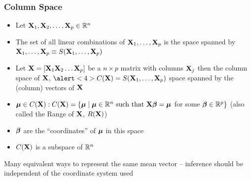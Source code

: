 \documentclass[handout]{beamer}
\begin{document}
\begin{frame}
  \frametitle{Column Space}
\begin{itemize}
\item Let $\mathbf{X}_1, \mathbf{X}_2,\ldots, \mathbf{X}_p \in \mathbb{R}^n$  \pause
\item The set of all linear combinations of $\mathbf{X}_1, \ldots, \mathbf{X}_p$ is
  the space spanned by $\mathbf{X}_1, \ldots, \mathbf{X}_p \equiv S(\mathbf{X}_1, \ldots,
  \mathbf{X}_p)$  \pause
\item Let $\mathbf{X} = [ \mathbf{X}_1\mathbf{X}_2 \ldots \mathbf{X}_p]$ be a $n \times p$ matrix with
  columns $\mathbf{X}_j$ then the column space of $\mathbf{X}$, $\alert<4>{C(\X) = S(\X_1, \ldots,
  \X_p)}$ space spanned by the (column) vectors of $\mathbf{X}$ \pause
\item $\boldsymbol{\mu} \in C(\mathbf{X}): C(\mathbf{X}) = \{\boldsymbol{\mu} \mid \boldsymbol{\mu} \in \mathbb{R}^n \text{ such
    that } \mathbf{X} \boldsymbol{\beta} =
    \boldsymbol{\mu} $ for some $\boldsymbol{\beta} \in \mathbb{R}^p\}$  (also called the Range of $\mathbf{X}$,
    $R(\mathbf{X})$) \pause
\item $\boldsymbol{\beta}$ are the ``coordinates'' of $\boldsymbol{\mu}$  in this space \pause
\item $C(\mathbf{X})$ is a subspace of $\mathbb{R}^n$
\end{itemize}
Many equivalent ways to represent the same mean vector -- inference
should be independent of the coordinate system used \pause

\end{frame}
\end{document}
